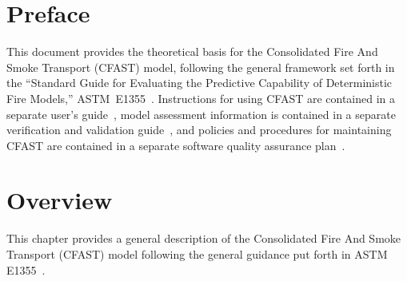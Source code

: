 \documentclass[12pt,twoside]{book}
\begin{document}
\pagestyle{plain}
\setcounter{page}{3}



%
%

\chapter{Preface}

This document provides the theoretical basis for the Consolidated Fire And Smoke Transport (CFAST) model, following the general framework set forth in the ``Standard Guide for Evaluating the Predictive Capability of Deterministic Fire Models,'' ASTM~E1355~\cite{CFAST:ASTM:E1355}. Instructions for using CFAST are contained in a separate user's guide~\cite{CFAST_Tech_Guide_8}, model assessment information is contained in a separate verification and validation guide~\cite{CFAST_Valid_Guide_8}, and policies and procedures for maintaining CFAST are contained in a separate software quality assurance plan~\cite{CFAST_Config_Guide_8}.



%
%





\cleardoublepage
{}
{}
\tableofcontents

\cleardoublepage
{}
{}
\listoffigures


\mainmatter

%
%

\chapter{Overview}

This chapter provides a general description of the Consolidated Fire And Smoke Transport (CFAST) model following the general guidance put forth in ASTM E1355~\cite{CFAST:ASTM:E1355}.

\end{document}
